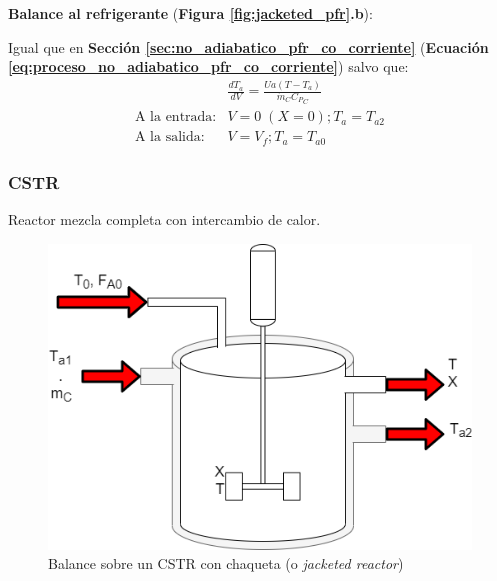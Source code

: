         
            \textbf{Balance al refrigerante} (\textbf{Figura \ref{fig:jacketed_pfr}.b}):
            
            Igual que en \textbf{Sección \ref{sec:no_adiabatico_pfr_co_corriente}} (\textbf{Ecuación \ref{eq:proceso_no_adiabatico_pfr_co_corriente}}) salvo que:
            \begin{equation}
            \label{eq:proceso_no_adiabatico_pfr_contra_corriente}
                \begin{matrix}
                     & \frac{dT_{a}}{dV} = \frac{Ua \left ( T - T_{a} \right )}{\dot{m}_{C} {C_{P}}_{C}} \\
                    \text{A la entrada:} & V = 0\;(X = 0); T_{a} = T_{a2} \\
                    \text{A la salida:} & V = V_{f}; T_{a} = T_{a0}
                \end{matrix}
            \end{equation}
        
        \subsubsection{CSTR}
        
        Reactor mezcla completa con intercambio de calor.
        
        \begin{figure}
            \centering
            \includegraphics[width=.5\textwidth]{img/diagramas/jacketed_cstr.png}
            \caption{Balance sobre un CSTR con chaqueta (o \textit{jacketed reactor})}
            \label{fig:jacketed_cstr}
        \end{figure}
        
